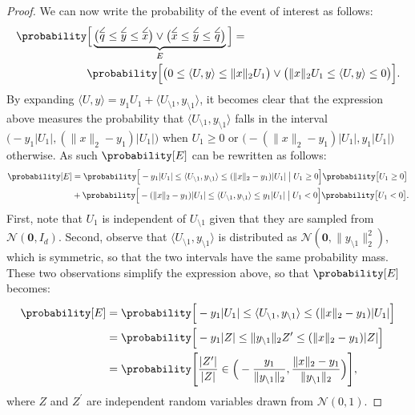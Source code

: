 \begin{proof}
We can now write the probability of the event of interest as follows:
\begin{align*}
    \probability&\Big[
        \underbrace{
            \big( \overset{\angle}{q} \leq \overset{\angle}{y} \leq \overset{\angle}{x} \big) \lor
            \big( \overset{\angle}{x} \leq \overset{\angle}{y} \leq \overset{\angle}{q} \big) }_{E}\Big] = \\
    &\probability\Big[
            \big( 0 \leq \langle U, y \rangle \leq \lVert x \rVert_2 U_1 \big) \lor
            \big( \lVert x \rVert_2 U_1 \leq \langle U, y \rangle \leq 0 \big) \Big].
\end{align*}
By expanding $\langle U, y \rangle = y_1 U_1 + \langle U_{\setminus 1}, y_{\setminus 1} \rangle$, it becomes clear that the expression
above measures the probability that $\langle U_{\setminus 1}, y_{\setminus 1} \rangle$ falls in the interval
$\big(-y_1 \lvert U_1 \rvert, (\lVert x \rVert_2 - y_1)\lvert U_1 \rvert \big)$ when $U_1 \geq 0$ or
$\big(-(\lVert x \rVert_2 - y_1) \lvert U_1 \rvert, y_1 \lvert U_1 \rvert\big)$ otherwise.
As such $\probability[E]$ can be rewritten as follows:
\begin{align*}
    \probability[E] &=
    \probability\Big[
            -y_1 \lvert U_1 \rvert \leq \langle U_{\setminus 1}, y_{\setminus 1} \rangle \leq (\lVert x \rVert_2 - y_1)\lvert U_1 \rvert \;\big|\; U_1 \geq 0 \Big] \probability\big[ U_1 \geq 0 \big] \\
    &+ \probability\Big[-(\lVert x \rVert_2 - y_1)\lvert U_1 \rvert \leq \langle U_{\setminus 1}, y_{\setminus 1} \rangle \leq y_1 \lvert U_1 \rvert \;\big|\; U_1 < 0 \Big] \probability\big[ U_1 < 0 \big].
\end{align*}
First, note that $U_1$ is independent of $U_{\setminus 1}$ given that they are sampled from $\mathcal{N}(\mathbf{0}, I_d)$.
Second, observe that $\langle U_{\setminus 1}, y_{\setminus 1} \rangle$ is distributed as $\mathcal{N}(\mathbf{0}, \lVert y_{\setminus 1} \rVert_2^2)$,
which is symmetric, so that the two intervals have the same probability mass.
These two observations simplify the expression above, so that $\probability[E]$ becomes:
\begin{align*}
    \probability[ E ] &= \probability\Big[ -y_1 \lvert U_1 \rvert \leq \langle U_{\setminus 1}, y_{\setminus 1} \rangle \leq (\lVert x \rVert_2 - y_1)\lvert U_1 \rvert \Big] \\
    &= \probability\Big[ -y_1 \lvert Z \rvert \leq \lVert y_{\setminus 1} \rVert_2 Z^\prime \leq (\lVert x \rVert_2 - y_1)\lvert Z \rvert \Big] \\
    &= \probability\Bigg[ \frac{\lvert Z' \rvert}{\lvert Z \rvert} \in \Big( -\frac{y_1}{\lVert y_{\setminus 1} \rVert_2}, \frac{\lVert x \rVert_2 - y_1}{\lVert y_{\setminus 1} \rVert_2} \Big) \Bigg],
\end{align*}
where $Z$ and $Z^\prime$ are independent random variables drawn from $\mathcal{N}(0, 1)$.


\end{proof}

